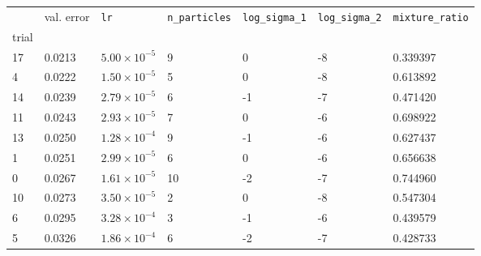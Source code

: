 \begin{tabular}{lp{2cm}p{2cm}p{2cm}p{2cm}p{2cm}p{2cm}}
\toprule
{} &  val. error &         \texttt{lr} &  \texttt{n\_particles} &  \texttt{log\_sigma\_1} &  \texttt{log\_sigma\_2} &  \texttt{mixture\_ratio} \\
trial &             &                     &                        &                         &                         &                          \\
\midrule
17    &      0.0213 & $5.00\times10^{-5}$ &                      9 &                       0 &                      -8 &                 0.339397 \\
4     &      0.0222 & $1.50\times10^{-5}$ &                      5 &                       0 &                      -8 &                 0.613892 \\
14    &      0.0239 & $2.79\times10^{-5}$ &                      6 &                      -1 &                      -7 &                 0.471420 \\
11    &      0.0243 & $2.93\times10^{-5}$ &                      7 &                       0 &                      -6 &                 0.698922 \\
13    &      0.0250 & $1.28\times10^{-4}$ &                      9 &                      -1 &                      -6 &                 0.627437 \\
1     &      0.0251 & $2.99\times10^{-5}$ &                      6 &                       0 &                      -6 &                 0.656638 \\
0     &      0.0267 & $1.61\times10^{-5}$ &                     10 &                      -2 &                      -7 &                 0.744960 \\
10    &      0.0273 & $3.50\times10^{-5}$ &                      2 &                       0 &                      -8 &                 0.547304 \\
6     &      0.0295 & $3.28\times10^{-4}$ &                      3 &                      -1 &                      -6 &                 0.439579 \\
5     &      0.0326 & $1.86\times10^{-4}$ &                      6 &                      -2 &                      -7 &                 0.428733 \\
\bottomrule
\end{tabular}
